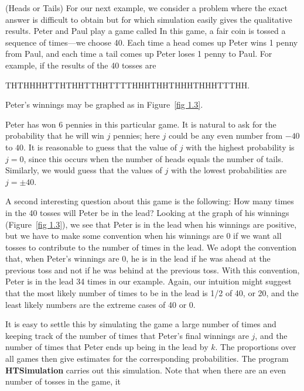 \begin{example}(Heads or Tails)\label{exam 1.3}
For our next example, we consider a problem
where the exact answer is difficult to obtain but for which simulation easily
gives the qualitative results.  Peter and Paul play a game called   In this game, a fair coin is tossed a sequence of times---we choose
40.  Each time a head comes up Peter wins 1 penny from Paul, and each time a
tail comes up Peter loses 1 penny to Paul.  For example, if the results of
the
40 tosses are
\begin{center}
THTHHHHTTHTHHTTHHTTTTHHHTHHTHHHTHHHTTTHH.
\end{center}
\noindent Peter's winnings may be graphed as in Figure~\ref{fig 1.3}.
\par
Peter has won 6 pennies in this particular game.  It is natural to ask for
the probability that he will win $j$ pennies; here $j$ could be any even
number from $-40$ to $40$.  It is reasonable to guess that the value of $j$ with
the highest probability is $j = 0$, since this occurs when the number of heads
equals the number of tails.  Similarly, we would guess that the values of $j$ with
the lowest probabilities are $j = \pm 40$.
\par
A second interesting question about this game is the following: How many times
in the 40 tosses will Peter be in the lead?  Looking at the graph of his
winnings (Figure~\ref{fig 1.3}), we see that Peter is in the lead when his winnings 
are positive, but
we have to make some convention when his winnings are 0 if we want all tosses
to contribute to the number of times in the lead.  We adopt the convention
that, when Peter's winnings are 0, he is in the lead if he was ahead at the
previous toss and not if he was behind at the previous toss.  With this
convention, Peter is in the lead 34 times in our example.  Again, our
intuition might suggest that the most likely number of times to be in the
lead is 1/2 of 40, or 20, and the least likely numbers are the extreme cases of 40
or 0.
\par
It is easy to settle this by simulating the game a large number of times and
keeping track of the number of times that Peter's final winnings are $j$, and
the number of times that Peter ends up being in the lead by $k$.  The
proportions over all games then give estimates for the corresponding
probabilities.  The program {\bf HTSimulation} carries out this
simulation.  Note that when there are an even number of tosses in the game, it

\end{example}
